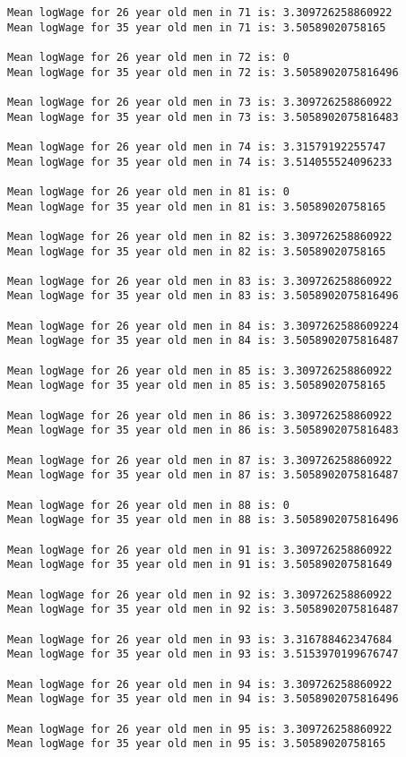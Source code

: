 \documentclass[11pt]{article}
\begin{document}
\begin{Verbatim}[commandchars=\\\{\}]
Mean logWage for 26 year old men in 71 is: 3.309726258860922
Mean logWage for 35 year old men in 71 is: 3.50589020758165

Mean logWage for 26 year old men in 72 is: 0
Mean logWage for 35 year old men in 72 is: 3.5058902075816496

Mean logWage for 26 year old men in 73 is: 3.309726258860922
Mean logWage for 35 year old men in 73 is: 3.5058902075816483

Mean logWage for 26 year old men in 74 is: 3.31579192255747
Mean logWage for 35 year old men in 74 is: 3.514055524096233

Mean logWage for 26 year old men in 81 is: 0
Mean logWage for 35 year old men in 81 is: 3.50589020758165

Mean logWage for 26 year old men in 82 is: 3.309726258860922
Mean logWage for 35 year old men in 82 is: 3.50589020758165

Mean logWage for 26 year old men in 83 is: 3.309726258860922
Mean logWage for 35 year old men in 83 is: 3.5058902075816496

Mean logWage for 26 year old men in 84 is: 3.3097262588609224
Mean logWage for 35 year old men in 84 is: 3.5058902075816487

Mean logWage for 26 year old men in 85 is: 3.309726258860922
Mean logWage for 35 year old men in 85 is: 3.50589020758165

Mean logWage for 26 year old men in 86 is: 3.309726258860922
Mean logWage for 35 year old men in 86 is: 3.5058902075816483

Mean logWage for 26 year old men in 87 is: 3.309726258860922
Mean logWage for 35 year old men in 87 is: 3.5058902075816487

Mean logWage for 26 year old men in 88 is: 0
Mean logWage for 35 year old men in 88 is: 3.5058902075816496

Mean logWage for 26 year old men in 91 is: 3.309726258860922
Mean logWage for 35 year old men in 91 is: 3.505890207581649

Mean logWage for 26 year old men in 92 is: 3.309726258860922
Mean logWage for 35 year old men in 92 is: 3.5058902075816487

Mean logWage for 26 year old men in 93 is: 3.316788462347684
Mean logWage for 35 year old men in 93 is: 3.5153970199676747

Mean logWage for 26 year old men in 94 is: 3.309726258860922
Mean logWage for 35 year old men in 94 is: 3.5058902075816496

Mean logWage for 26 year old men in 95 is: 3.309726258860922
Mean logWage for 35 year old men in 95 is: 3.50589020758165


    \end{Verbatim}
\end{document}
